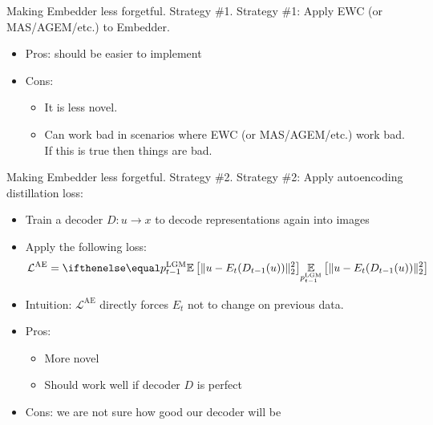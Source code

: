 \documentclass[handout, 10pt]{beamer}
\begin{document}
\begin{frame}{Making Embedder less forgetful. Strategy \#1.}
\pause Strategy \#1: Apply EWC (or MAS/AGEM/etc.) to Embedder.

\begin{itemize}
    \item\pause Pros: should be easier to implement
    \item\pause Cons:
    \begin{itemize}
        \item\pause It is less novel.
        \item\pause Can work bad in scenarios where EWC (or MAS/AGEM/etc.) work bad. If this is true then things are bad.
    \end{itemize}
\end{itemize}
\end{frame}

\begin{frame}{Making Embedder less forgetful. Strategy \#2.}
\pause Strategy \#2: Apply autoencoding distillation loss:
\begin{itemize}
    \item\pause Train a decoder $D: u \to x$ to decode representations again into images
    \item\pause Apply the following loss:
    \[
    \mathcal{L}^{\text{AE}} = \expect[p^{\text{LGM}}_{t-1}]{\|u - E_t(D_{t-1}(u))\|_2^2}
    \]
    \item\pause Intuition: $\mathcal{L}^{\text{AE}}$ directly forces $E_t$ not to change on previous data.
    \item\pause Pros:
    \begin{itemize}
        \item\pause More novel
        \item\pause Should work well if decoder $D$ is perfect
    \end{itemize}
    
    \item\pause Cons: we are not sure how good our decoder will be
\end{itemize}
\end{frame}
\end{document}

